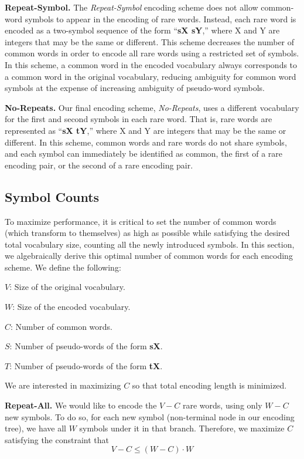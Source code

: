 \noindent\textbf{Repeat-Symbol.}
The \emph{Repeat-Symbol} encoding scheme does not allow common-word symbols to
appear in the encoding of rare words. Instead, each rare word is encoded as a
two-symbol sequence of the form ``\textbf{sX sY},'' where X and Y are integers
that may be the same or different. This scheme decreases the number of common
words in order to encode all rare words using a restricted set of symbols. In
this scheme, a common word in the encoded vocabulary always corresponds to a
common word in the original vocabulary, reducing ambiguity for common word
symbols at the expense of increasing ambiguity of pseudo-word symbols.

\noindent\textbf{No-Repeats.}
Our final encoding scheme, \emph{No-Repeats}, uses a different vocabulary for
the first and second symbols in each rare word. That is, rare words are
represented as ``\textbf{sX tY},'' where X and Y are integers that may be the
same or different.  In this scheme, common words and rare words do not share
symbols, and each symbol can immediately be identified as common, the first of
a rare encoding pair, or the second of a rare encoding pair.

\subsection{Symbol Counts}
To maximize performance, it is critical to set the number of common words (which
transform to themselves) as high as possible while satisfying the desired total vocabulary size,
counting all the newly introduced symbols. In this section, we algebraically derive
this optimal number of common words for each encoding scheme. We define the following:
\begin{description}
\item{$V$:} Size of the original vocabulary.
\item{$W$:} Size of the encoded vocabulary.
\item{$C$:} Number of common words.
\item{$S$:} Number of pseudo-words of the form \textbf{sX}.
\item{$T$:} Number of pseudo-words of the form \textbf{tX}.
\end{description}

We are interested in maximizing $C$ so that total encoding length is minimized.

\noindent\textbf{Repeat-All.}
We would like to encode the $V - C$ rare words, using only $W - C$ new symbols.
To do so, for each new symbol (non-terminal node in our encoding tree), we have
all $W$ symbols under it in that branch. Therefore, we maximize $C$ satisfying
the constraint that
$$V - C \leq (W - C) \cdot W$$

